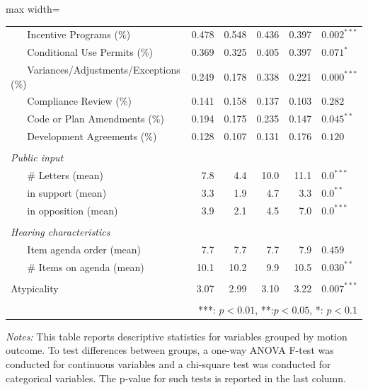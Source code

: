 \begin{table}[H]
\begin{adjustbox}{max width=\textwidth}
\begin{threeparttable}
\begin{tabular}{lrrrrl}
~ ~ Incentive Programs (\%) & 0.478 & 0.548 & 0.436 & 0.397 & $0.002^{***}$ \\
~ ~ Conditional Use Permits (\%) & 0.369 & 0.325 & 0.405 & 0.397 & $0.071^{*}$ \\
~ ~ Variances/Adjustments/Exceptions (\%) & 0.249 & 0.178 & 0.338 & 0.221 & $0.000^{***}$ \\
~ ~ Compliance Review (\%) & 0.141 & 0.158 & 0.137 & 0.103 & $0.282^{}$ \\
~ ~ Code or Plan Amendments (\%) & 0.194 & 0.175 & 0.235 & 0.147 & $0.045^{**}$ \\
~ ~ Development Agreements (\%) & 0.128 & 0.107 & 0.131 & 0.176 & $0.120^{}$ \\
 & & & & & \\
\textit{Public input} & & & & & \\
~ ~ \# Letters (mean) & 7.8 & 4.4 & 10.0 & 11.1 & $0.0^{***}$ \\
~ ~ in support (mean) & 3.3 & 1.9 & 4.7 & 3.3 & $0.0^{**}$ \\
~ ~ in opposition (mean) & 3.9 & 2.1 & 4.5 & 7.0 & $0.0^{***}$ \\
 & & & & & \\
\textit{Hearing characteristics} & & & & & \\
~ ~ Item agenda order (mean) & 7.7 & 7.7 & 7.7 & 7.9 & $0.459^{}$ \\
~ ~ \# Items on agenda (mean) & 10.1 & 10.2 & 9.9 & 10.5 & $0.030^{**}$ \\
 & & & & & \\
Atypicality & 3.07 & 2.99 & 3.10 & 3.22 & $0.007^{***}$ \\

 & & & & & \\
\bottomrule
\multicolumn{6}{r}{***: $p < 0.01$, **:$p < 0.05$, *: $p < 0.1$}
\end{tabular}
\begin{tablenotes}
\item {\textit{Notes: } This table reports descriptive statistics for variables grouped by motion outcome. To test differences between groups, a one-way ANOVA F-test was conducted for continuous variables and a chi-square test was conducted for categorical variables. The p-value for such tests is reported in the last column.}
\end{tablenotes}
\end{threeparttable}
\end{adjustbox}
\end{table}
